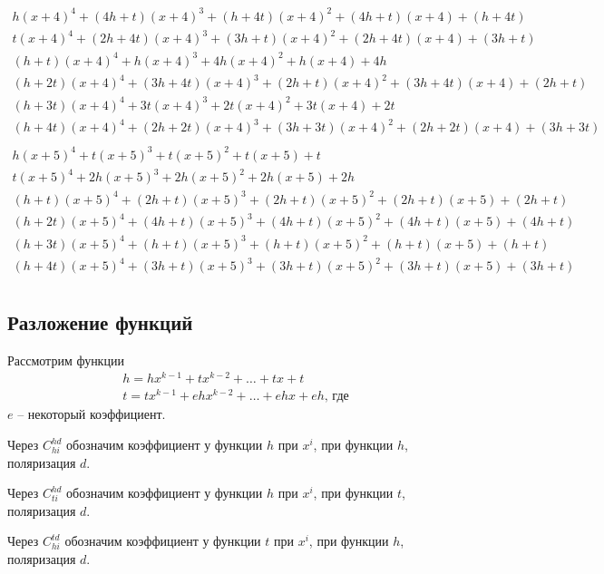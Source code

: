 \documentclass[bibliography=totoc, a4paper, 12pt]{extarticle}
\begin{document}
$$\begin{array}{l}
h(x+4)^4 + (4h + t)(x+4)^3 + (h + 4t)(x+4)^2 + (4h + t)(x+4) + (h + 4t)\\
t(x+4)^4 + (2h + 4t)(x+4)^3 + (3h + t)(x+4)^2 + (2h + 4t)(x+4) + (3h + t)\\
(h + t)(x+4)^4 + h(x+4)^3 + 4h(x+4)^2 + h(x+4) + 4h\\
(h + 2t)(x+4)^4 + (3h + 4t)(x+4)^3 + (2h + t)(x+4)^2 + (3h + 4t)(x+4) +
(2h + t)\\
(h + 3t)(x+4)^4 + 3t(x+4)^3 + 2t(x+4)^2 + 3t(x+4) + 2t\\
(h + 4t)(x+4)^4 + (2h + 2t)(x+4)^3 + (3h + 3t)(x+4)^2 + (2h + 2t)(x+4) +
(3h + 3t)\\
\end{array}$$
$$\begin{array}{l}
h(x+5)^4 + t(x+5)^3 + t(x+5)^2 + t(x+5) + t\\
t(x+5)^4 + 2h(x+5)^3 + 2h(x+5)^2 + 2h(x+5) + 2h\\
(h + t)(x+5)^4 + (2h + t)(x+5)^3 + (2h + t)(x+5)^2 + (2h + t)(x+5) + (2h + t)\\
(h + 2t)(x+5)^4 + (4h + t)(x+5)^3 + (4h + t)(x+5)^2 + (4h + t)(x+5) + (4h + t)\\
(h + 3t)(x+5)^4 + (h + t)(x+5)^3 + (h + t)(x+5)^2 + (h + t)(x+5) + (h + t)\\
(h + 4t)(x+5)^4 + (3h + t)(x+5)^3 + (3h + t)(x+5)^2 + (3h + t)(x+5) + (3h + t)\\
\end{array}$$

\subsection{Разложение функций}
Рассмотрим функции
\[ \begin{array}{l}
    h = hx^{k-1} + tx^{k-2} + \dots + tx + t \\
    t = tx^{k-1} + ehx^{k-2} + \dots + ehx + eh \text{, где}
\end{array} \]
$e$ -- некоторый коэффициент.

Через $C^{hd}_{hi}$ обозначим коэффициент у функции $h$ при $x^i$, при
функции $h$, поляризация $d$.

Через $C^{hd}_{ti}$ обозначим коэффициент у функции $h$ при $x^i$, при
функции $t$, поляризация $d$.

Через $C^{td}_{hi}$ обозначим коэффициент у функции $t$ при $x^i$, при
функции $h$, поляризация $d$.
\end{document}
